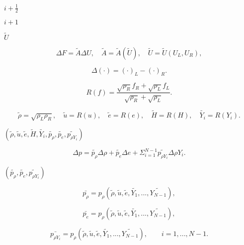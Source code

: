 \documentclass{article}
\begin{document}
$i+\frac{1}{2}$
\pagebreak

$i+1$
\pagebreak

$\tilde{U}$
\pagebreak

\[ \begin{equation*}\label{eq:Roe} \Delta F = \tilde{A}\Delta U, \quad \tilde{A}=\tilde{A}(\tilde{U}),\quad \tilde{U}=\tilde{U}(U_L, U_R), \end{equation*} \]
\pagebreak

\[ \begin{equation*} \Delta(\cdot)=(\cdot)_L-(\cdot)_R. \end{equation*} \]
\pagebreak

\[ \begin{equation*} R(f)= \frac{\sqrt{\rho_R}f_R+\sqrt{\rho_L}f_L}{\sqrt{\rho_R}+\sqrt{\rho_L}}. \end{equation*} \]
\pagebreak

\[ \begin{equation*} \tilde{\rho}=\sqrt{\rho_L\rho_R}, \quad \tilde{u}=R(u), \quad\tilde{e}=R(e), \quad\tilde{H}=R(H), \quad \tilde{Y_i}=R(Y_i). \end{equation*} \]
\pagebreak

$(\tilde{\rho},\tilde{u}, \tilde{e},\tilde{H},\tilde{Y_i},\tilde{p_{\rho}},\tilde{p_e},\tilde{p_{\rho Y_i}})$
\pagebreak

\[ \begin{equation*}\label{eq:pconstraint} \Delta p=\tilde{p_{\rho}}\Delta \rho +\tilde{p_e}\Delta e+\Sigma_{i=1}^{N-1}\tilde{p_{\rho Y_i}}\Delta \rho Y_i. \end{equation*} \]
\pagebreak

$(\tilde{p_{\rho}},\tilde{p_e},\tilde{p_{\rho Y_i}})$
\pagebreak

\[ \begin{equation*} \bar{p_{\rho}}=p_{\rho}(\tilde{\rho},\tilde{u}, \tilde{e},\tilde{Y_1},...,\tilde{Y_{N-1}}), \end{equation*} \]
\pagebreak

\[ \begin{equation*} \bar{p_{e}}=p_{\rho}(\tilde{\rho},\tilde{u}, \tilde{e},\tilde{Y_1},...,\tilde{Y_{N-1}}), \end{equation*} \]
\pagebreak

\[ \begin{equation*} \bar{p_{\rho Y_i}}=p_{\rho}(\tilde{\rho},\tilde{u}, \tilde{e},\tilde{Y_1},...,\tilde{Y_{N-1}}), \qquad i=1,...,N-1. \end{equation*} \]
\pagebreak
\end{document}
